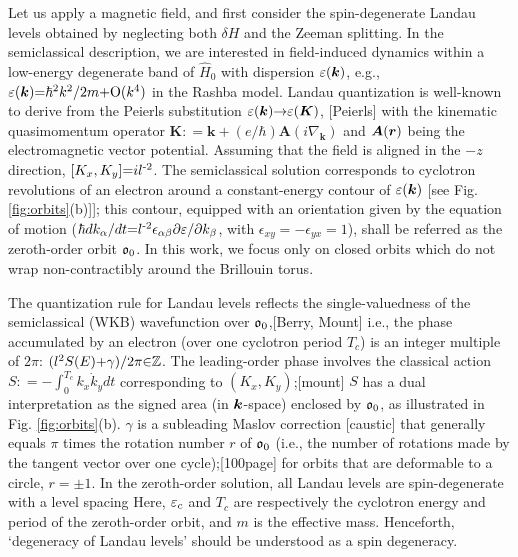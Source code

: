\documentclass[aps, prb, showpacs, twocolumn, notitlepage, superscriptaddress]{revtex4-1}
\begin{document}
Let us apply a magnetic field, and first consider the spin-degenerate Landau levels obtained by neglecting both $\delta H$ and the Zeeman splitting. In the  semiclassical description,  we are interested in  field-induced dynamics within a low-energy degenerate band of $\hat{H}_0$ with  dispersion $\varepsilon(\boldsymbol{k})$, e.g., $\varepsilon(\boldsymbol{k}){=}\hbar^2 k^2/2m{+}\text{O}(k^4)$ in the Rashba model.    Landau quantization is well-known to derive from the Peierls substitution $\varepsilon(\boldsymbol{k}){\rightarrow}\varepsilon(\boldsymbol{K})$, [Peierls] with the kinematic quasimomentum operator   $\boldsymbol{K}{:}{=}\boldsymbol{k}{+}(e/\hbar) \boldsymbol{A}(i\nabla_{\boldsymbol{k}})$ and $\boldsymbol{A}(\boldsymbol{r})$ being the electromagnetic vector potential. Assuming that the field is aligned in the ${-}z$ direction, $[K_x,K_y]{=}il^{\text{-}2}$. The semiclassical solution corresponds to  cyclotron revolutions of an electron around a constant-energy contour of $\varepsilon(\boldsymbol{k})$ [see Fig. \ref{fig:orbits}(b)]]; this contour, equipped with an orientation given by the equation of motion ($ \hbar dk_{\alpha}/dt {=} l^{\text{-}2} \epsilon_{\alpha\beta}\partial \varepsilon/\partial k_{\beta} $, with $\epsilon_{xy}{=}{-}\epsilon_{yx}{=}1$), shall be referred as the zeroth-order orbit $\mathfrak{o}_0$.  In this work, we focus only on closed orbits which do not wrap 
non-contractibly around the Brillouin torus.



The quantization rule for Landau levels reflects the single-valuedness of the semiclassical (WKB) wavefunction over $\mathfrak{o}_0$,[Berry, Mount] i.e.,  the phase accumulated by an electron (over one cyclotron period $T_c$) is an integer multiple of $2\pi$: $(l^2S(E){+}\gamma)/2\pi{\in}\mathbb{Z}$. The leading-order phase   involves the classical action $S{:}{=}-\int_{0}^{T_c} k_x \dot{k}_y dt$  corresponding to $(K_x,K_y)$;[mount] $S$ has a dual interpretation as the signed area (in $\boldsymbol{k}$-space) enclosed by $\mathfrak{o}_0$, as illustrated in Fig. \ref{fig:orbits}(b). $\gamma$ is a subleading Maslov correction [caustic] that generally equals $\pi$ times the rotation number $r$ of $\mathfrak{o}_0$ (i.e., the number of rotations made by the tangent vector over one cycle);[100page] for orbits that are deformable to a circle,  $r{=}{\pm} 1$. In the zeroth-order  solution, all Landau levels are spin-degenerate with a level spacing 
Here, $\varepsilon_c$ and $T_c$ are respectively the cyclotron energy and period of the zeroth-order orbit, and $m$ is the effective mass. Henceforth, `degeneracy of Landau levels' should be understood as a spin degeneracy. 
\end{document}
